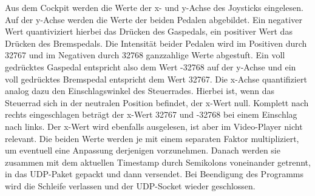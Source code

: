 Aus dem Cockpit werden die Werte der x- und y-Achse des Joysticks eingelesen. Auf der y-Achse werden die Werte der beiden Pedalen abgebildet. Ein negativer Wert quantiviziert hierbei das Drücken des Gaspedals, ein positiver Wert das Drücken des Bremspedals. Die Intensität beider Pedalen wird im Positiven durch 32767 und im Negativen durch 32768 ganzzahlige Werte abgestuft. Ein voll gedrücktes Gaspedal entspricht also dem Wert -32768 auf der y-Achse und ein voll gedrücktes Bremspedal entspricht dem Wert 32767. Die x-Achse quantifiziert analog dazu den Einschlagswinkel des Steuerrades. Hierbei ist, wenn das Steuerrad sich in der neutralen Position befindet, der x-Wert null. Komplett nach rechts eingeschlagen beträgt der x-Wert 32767 und -32768 bei einem Einschlag nach links. Der x-Wert wird ebenfalls ausgelesen, ist aber im Video-Player nicht relevant. Die beiden Werte werden je mit einem separaten Faktor multipliziert, um eventuell eine Anpassung derjenigen vorzunehmen. Danach werden sie zusammen mit dem aktuellen Timestamp durch Semikolons voneinander getrennt, in das UDP-Paket gepackt und dann versendet. Bei Beendigung des Programms wird die Schleife verlassen und der UDP-Socket wieder geschlossen.

